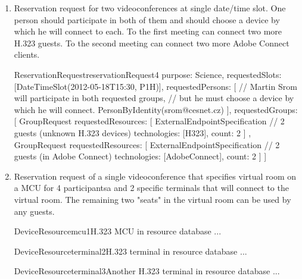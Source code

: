 \begin{enumerate}
\begin{EntityExample}{ReservationRequest}{reservationRequest3}{}
purpose: Science,
requestedSlots: [DateTimeSlot(2012-05-18T15:30, P1H)],
requestedPersons: [
  PersonByIdentity(srom@cesnet.cz),  // Martin Srom (must choose a device)
  PersonByIdentity(hopet@cesnet.cz), // Petr Holub (must choose a device)
  Person { // Jan Ruzicka (must choose a device)
    name: Jan Ruzicka,
    email: janru@cesnet.cz
  }
]
\end{EntityExample}

\item Reservation request for two videoconferences at single date/time slot. One person should participate in both of them and should choose a device by which he will connect to each. To the first meeting can connect two more H.323 guests. To the second meeting can connect two more Adobe Connect clients.

\begin{EntityExample}{ReservationRequest}{reservationRequest4}{}
purpose: Science,
requestedSlots: [DateTimeSlot(2012-05-18T15:30, P1H)],
requestedPersons: [
  // Martin Srom will participate in both requested groups,
  // but he must choose a device by which he will connect.
  PersonByIdentity(srom@cesnet.cz)
],
requestedGroups: [
  GroupRequest {
    requestedResources: [
      ExternalEndpointSpecification { // 2 guests (unknown H.323 devices)
        technologies: [H323],
        count: 2
      }
    ]
  },
  GroupRequest {
    requestedResources: [
      ExternalEndpointSpecification { // 2 guests (in Adobe Connect)
        technologies: [AdobeConnect],
        count: 2
      }
    ]
  }
]
\end{EntityExample}

\item Reservation request of a single videoconference that specifies virtual room on a MCU for 4 participantsa and 2 specific terminals that will connect to the virtual room. The remaining two "seats" in the virtual room can be used by any guests.

\begin{EntityExample}{DeviceResource}{mcu1}{H.323 MCU in resource database}
...
\end{EntityExample}

\begin{EntityExample}{DeviceResource}{terminal2}{H.323 terminal in resource database}
...
\end{EntityExample}

\begin{EntityExample}{DeviceResource}{terminal3}{Another H.323 terminal in resource database}
...
\end{EntityExample}


\end{enumerate}
